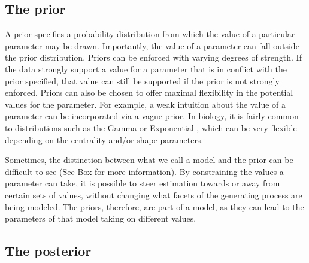 \subsection{The prior}


A prior specifies a probability distribution from which the value of a particular parameter may be drawn.
Importantly, the value of a parameter can fall outside the prior distribution.
Priors can be enforced with varying degrees of strength.
If the data strongly support a value for a parameter that is in conflict with the prior specified, that value can still be supported if the prior is not strongly enforced.
Priors can also be chosen to offer maximal flexibility in the potential values for the parameter.
For example, a weak intuition about the value of a parameter can be incorporated via a vague prior.
In biology, it is fairly common to  distributions such as the Gamma or Exponential , which can be very flexible depending on the centrality and/or shape parameters.

Sometimes, the distinction between what we call a model and the prior can be difficult to see (See Box  for more information).
By constraining the values a parameter can take, it is possible to steer estimation towards or away from certain sets of values, without changing what facets of the generating process are being modeled.
The priors, therefore, are part of a model, as they can lead to the parameters of that model taking on different values.

\subsection{The posterior}


